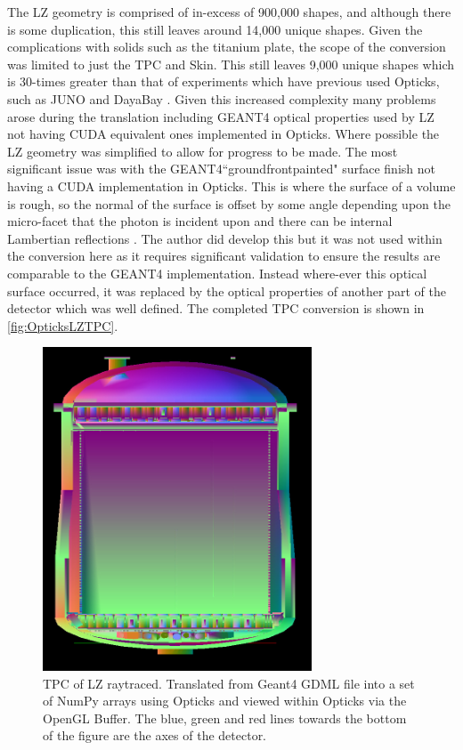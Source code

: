 \par
The LZ geometry is comprised of in-excess of 900,000 shapes, and although there is some duplication, this still leaves around 14,000 unique shapes.
Given the complications with solids such as the titanium plate, the scope of the conversion was limited to just the TPC and Skin.
This still leaves 9,000 unique shapes which is 30-times greater than that of experiments which have previous used Opticks, such as JUNO and DayaBay \cite{Opticks_CHEP_2021_ref}.
Given this increased complexity many problems arose during the translation including GEANT4 optical properties used by LZ not having CUDA equivalent ones implemented in Opticks.
Where possible the LZ geometry was simplified to allow for progress to be made.
The most significant issue was with the GEANT4``groundfrontpainted" surface finish not having a CUDA implementation in Opticks.
This is where the surface of a volume is rough, so the normal of the surface is offset by some angle depending upon the micro-facet that the photon is incident upon and there can be internal Lambertian reflections \cite{optical_photons_in_geant4_ref}.
The author did develop this but it was not used within the conversion here as it requires significant validation to ensure the results are comparable to the GEANT4 implementation.
Instead where-ever this optical surface occurred, it was replaced by the optical properties of another part of the detector which was well defined.
The completed TPC conversion is shown in \autoref{fig:OpticksLZTPC}.
\begin{figure}
\includegraphics[width=8cm]{Figures/Simulations/LZ_In_Opticks.png}
\centering
\caption{TPC of LZ raytraced. Translated from Geant4 GDML file into a set of NumPy arrays using Opticks and viewed within Opticks via the OpenGL Buffer.
The blue, green and red lines towards the bottom of the figure are the axes of the detector.}
\label{fig:OpticksLZTPC}
\end{figure}


